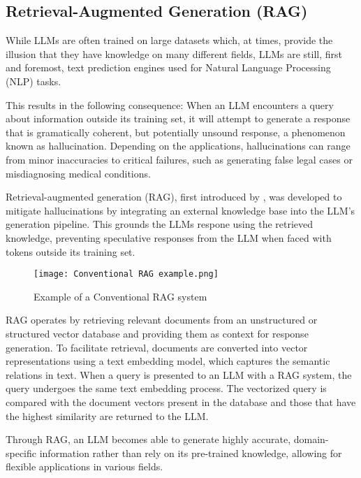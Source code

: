 \subsection{Retrieval-Augmented Generation (RAG)}
While LLMs are often trained on large datasets which, at times, provide the illusion that they have knowledge on many different fields, LLMs are still, first and foremost, text prediction engines used for Natural Language Processing (NLP) tasks.

This results in the following consequence: When an LLM encounters a query about information outside its training set, it will attempt to generate a response that is gramatically coherent, but potentially unsound response, a phenomenon known as hallucination. Depending on the applications, hallucinations can range from minor inaccuracies to critical failures, such as generating false legal cases \autocite{Bohannon_2024} or misdiagnosing medical conditions.

Retrieval-augmented generation (RAG), first introduced by \autocite{lewis2021retrievalaugmentedgenerationknowledgeintensivenlp}, was developed to mitigate hallucinations by integrating an external knowledge base into the LLM's generation pipeline. This grounds the LLMs respone using the retrieved knowledge, preventing speculative responses from the LLM when faced with tokens outside its training set.

\begin{figure}
	\texttt{[image: Conventional RAG example.png]}
	\caption{Example of a Conventional RAG system}
	\centering
	\label{fig:RAGexample}
\end{figure}

RAG operates by retrieving relevant documents from an unstructured or structured vector database and providing them as context for response generation. To facilitate retrieval, documents are converted into vector representations using a text embedding model, which captures the semantic relations in text. When a query is presented to an LLM with a RAG system, the query undergoes the same text embedding process. The vectorized query is compared with the document vectors present in the database and those that have the highest similarity are returned to the LLM.

Through RAG, an LLM becomes able to generate highly accurate, domain-specific information rather than rely on its pre-trained knowledge, allowing for flexible applications in various fields.

